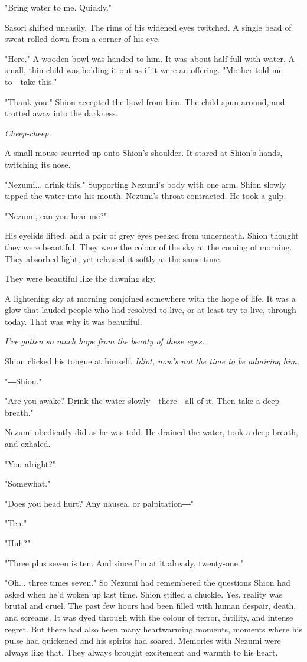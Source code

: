 "Bring water to me. Quickly."

Sasori shifted uneasily. The rims of his widened eyes twitched. A single
bead of sweat rolled down from a corner of his eye.

"Here." A wooden bowl was handed to him. It was about half-full with
water. A small, thin child was holding it out as if it were an offering.
"Mother told me to―take this."

"Thank you." Shion accepted the bowl from him. The child spun around,
and trotted away into the darkness.

\emph{Cheep-cheep.}

A small mouse scurried up onto Shion's shoulder. It stared at Shion's
hands, twitching its nose.

"Nezumi... drink this." Supporting Nezumi's body with one arm, Shion
slowly tipped the water into his mouth. Nezumi's throat contracted. He
took a gulp.

"Nezumi, can you hear me?"

His eyelids lifted, and a pair of grey eyes peeked from underneath.
Shion thought they were beautiful. They were the colour of the sky at
the coming of morning. They absorbed light, yet released it softly at
the same time.

They were beautiful like the dawning sky.

A lightening sky at morning conjoined somewhere with the hope of life.
It was a glow that lauded people who had resolved to live, or at least
try to live, through today. That was why it was beautiful.

\emph{I've gotten so much hope from the beauty of these eyes.}

Shion clicked his tongue at himself. \emph{Idiot, now's not the time to be
admiring him.}

"―Shion."

"Are you awake? Drink the water slowly―there―all of it. Then take a deep
breath."

Nezumi obediently did as he was told. He drained the water, took a deep
breath, and exhaled.

"You alright?"

"Somewhat."

"Does you head hurt? Any nausea, or palpitation―"

"Ten."

"Huh?"

"Three plus seven is ten. And since I'm at it already, twenty-one."

"Oh... three times seven." So Nezumi had remembered the questions Shion
had asked when he'd woken up last time. Shion stifled a chuckle. Yes,
reality was brutal and cruel. The past few hours had been filled with
human despair, death, and screams. It was dyed through with the colour
of terror, futility, and intense regret. But there had also been many
heartwarming moments, moments where his pulse had quickened and his
spirits had soared. Memories with Nezumi were always like that. They
always brought excitement and warmth to his heart.


